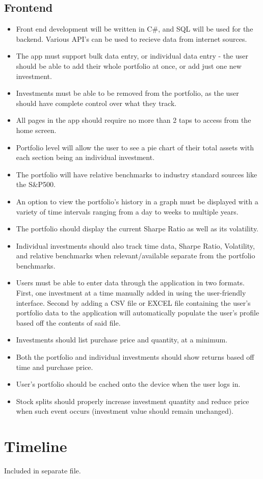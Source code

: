 \documentclass[onecolumn, draftclsnofoot,10pt, compsoc]{IEEEtran}
\begin{document}
\subsection{Frontend}
\begin{itemize}
	\item Front end development will be written in C\#, and SQL will be used for the backend. Various API's can be used to recieve data from internet sources.  
	\item The app must support bulk data entry, or individual data entry - the user should be able to 
		add their whole portfolio at once, or add just one new investment. 
	\item Investments must be able to be removed from the portfolio, as the user should 
		have complete control over what they track. 
	\item All pages in the app should require no more than 2 taps to access from the home screen.
	\item Portfolio level will allow the user to see a pie chart of their total assets with each section being an individual investment.
	\item The portfolio will have relative benchmarks to industry standard sources like the S\&P500.
	\item An option to view the portfolio's history in a graph must be displayed with a variety of time intervals ranging from a day to weeks to multiple years.
	\item The portfolio should display the current Sharpe Ratio as well as its volatility.
	\item Individual investments should also track time data, Sharpe Ratio, Volatility, and relative benchmarks when relevant/available separate from the portfolio benchmarks.
	\item Users must be able to enter data through the application in two formats. First, one investment at a time manually added in using the user-friendly interface. Second by
		adding a CSV file or EXCEL file containing the user's portfolio data to the application will automatically populate the user's profile based off the contents of said file.
	\item Investments should list purchase price and quantity, at a minimum.
	\item Both the portfolio and individual investments should show returns based off time and purchase price.
	\item User's portfolio should be cached onto the device when the user logs in.
	\item Stock splits should properly increase investment quantity and reduce price when such event occurs (investment value should remain unchanged).

	
\end{itemize}
\section{Timeline}
Included in separate file.

\end{document}
